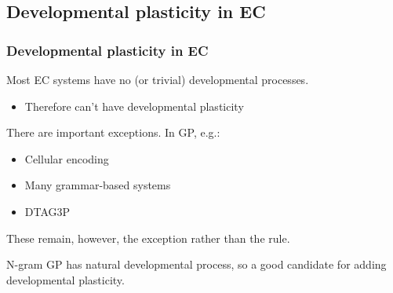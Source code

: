 \documentclass{beamer}
\newcommand{\linespace}{\vskip 0.25cm}
\begin{document}
\subsection{Developmental plasticity in EC}

\begin{frame}
	\frametitle{Developmental plasticity in EC}
	
	Most EC systems have no (or trivial) developmental processes.
	\begin{itemize}
		\item Therefore can't have developmental plasticity
	\end{itemize}
	
	\linespace
	
	There are important exceptions.  In GP, e.g.:
	\begin{itemize}
		\item Cellular encoding
		\item Many grammar-based systems
		\item DTAG3P
	\end{itemize}
	
	\linespace 
	
	These remain, however, the exception rather than the rule.
	
	\linespace
	
	N-gram GP has natural developmental process, so a good candidate for adding developmental plasticity.
\end{frame}
\end{document}

